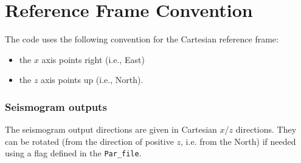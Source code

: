 
\chapter{Reference Frame Convention}\label{cha:Coordinates}


The code uses the following convention for the Cartesian reference frame:
\begin{itemize}
\item the $x$ axis points right (i.e., East)
\item the $z$ axis points up (i.e., North).
\end{itemize}


\subsection*{Seismogram outputs}

The seismogram output directions are given in Cartesian $x$/$z$
directions. They can be rotated (from the direction of positive $z$, i.e. from the North) if needed using a flag defined in the \texttt{Par\_file}.

